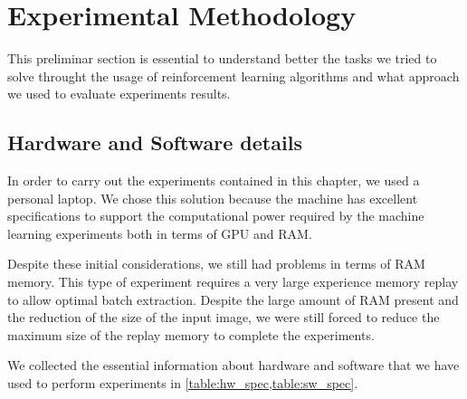 \section{Experimental Methodology}

This preliminar section is essential to understand better the tasks we tried to solve throught the usage of reinforcement learning algorithms and what approach we used to evaluate experiments results.

\subsection{Hardware and Software details}

In order to carry out the experiments contained in this chapter, we used a personal laptop.
We chose this solution because the machine has excellent specifications to support the computational power required by the machine learning experiments both in terms of GPU and RAM.

Despite these initial considerations, we still had problems in terms of RAM memory. This type of experiment requires a very large experience memory replay to allow optimal batch extraction. Despite the large amount of RAM present and the reduction of the size of the input image, we were still forced to reduce the maximum size of the replay memory to complete the experiments.

We collected the essential information about hardware and software that we have used to perform experiments in \vref{table:hw_spec,table:sw_spec}.

